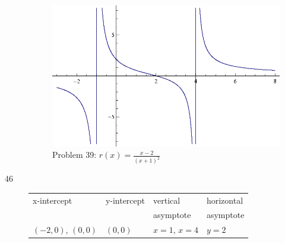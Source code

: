 \documentclass{exam}
\begin{document}
\begin{description}
      \begin{figure}[H]
        \centering
        \includegraphics[scale = 0.8]{problem39.eps}
        \caption*{ Problem 39: $r(x) = \frac{x - 2}{(x + 1)^2}$ }
      \end{figure}



    \item[46]
      \begin{tabular}{llll}
        \toprule
        x-intercept         & y-intercept & vertical          & horizontal \\
                            &             & asymptote         & asymptote \\
        \midrule
        $(-2, 0)$, $(0, 0)$  & $(0, 0)$    & $x = 1$, $x = 4$ & $y = 2$ \\
        \bottomrule
      \end{tabular}


\end{description}
\end{document}
